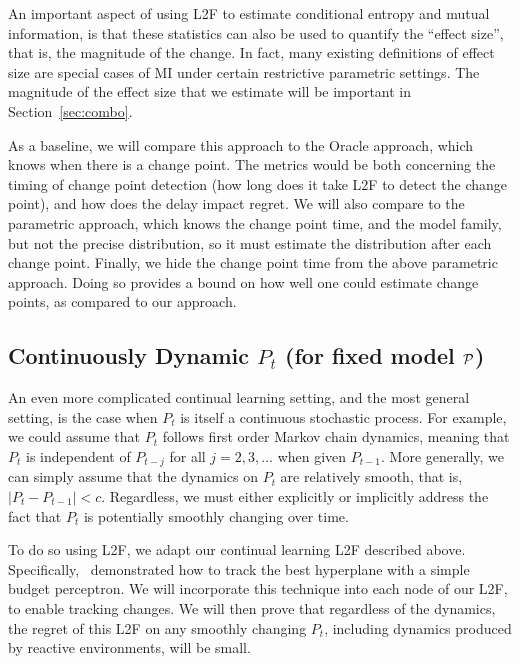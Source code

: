 \documentclass{article}
\begin{document}
An important aspect of using L2F to estimate conditional entropy and mutual information, is that these statistics can also be used to quantify the ``effect size'', that is, the magnitude of the change.  In fact, many existing definitions of effect size are special cases of MI under certain restrictive parametric settings.  The magnitude of the effect size that we estimate will be important in Section~\ref{sec:combo}.


As a baseline, we will compare this approach to the Oracle approach, which knows when there is a change point.  The metrics would be both concerning the timing of change point detection (how long does it take L2F to detect the change point), and how does the delay impact regret. We will also compare to the parametric approach, which knows the change point time, and the model family, but not the precise distribution, so it must estimate the distribution after each change point. Finally, we hide the change point time from the above parametric approach. Doing so provides a bound on how well one could estimate change points, as compared to our approach. 




\subsection{Continuously Dynamic $P_t$ (for fixed model $\mathcal{P}$)}
\label{sec:smooth}

An even more complicated continual learning setting, and the most general setting, is the case when $P_t$ is itself a continuous stochastic process.  For example, we could assume that $P_t$ follows  first order Markov chain dynamics, meaning that $P_t$ is independent of $P_{t-j}$  for all $j=2,3,...$ when given $P_{t-1}$.  More generally, we can simply assume that the dynamics on $P_t$ are relatively smooth, that is, $|P_t - P_{t-1}| < c$.  Regardless, we must either explicitly or implicitly address the fact that $P_t$ is potentially smoothly changing over time.  

To do so using L2F, we adapt our continual learning L2F described above.  Specifically,~\citet{Cavallanti2007} demonstrated how to track the best hyperplane with a simple budget perceptron.  We will incorporate this technique into each node of our L2F, to enable tracking changes. We will then prove that regardless of the dynamics, the regret of this L2F on any smoothly changing $P_t$, including dynamics produced by reactive environments, will be small.  
\end{document}
